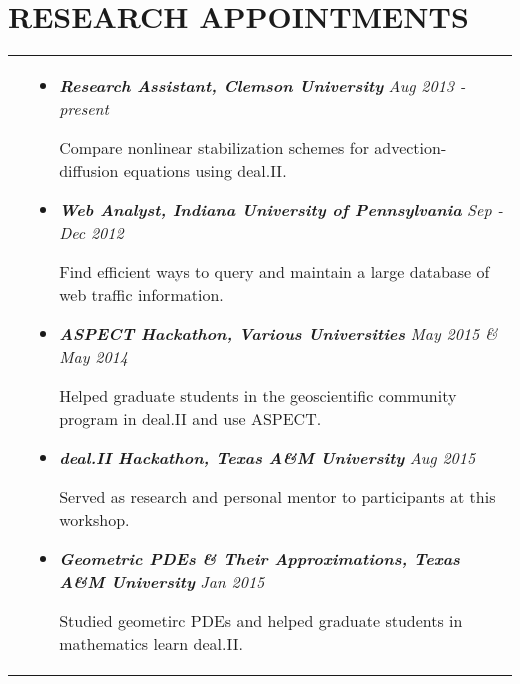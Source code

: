 \documentclass[10pt]{article}
\begin{document}
\section{\textbf{RESEARCH APPOINTMENTS}}
\vspace*{-\baselineskip}
\hskip-1.7in
\begin{tabularx}{1.5\linewidth}{>{\raggedleft\scshape}p{3cm}X}

  &\begin{itemize}
    \setlength\itemsep{.005em}
  \item \textbf{\textit{Research Assistant, Clemson University}}    \hspace{50 mm}\textit{Aug 2013 - present}

	Compare nonlinear stabilization schemes for advection-diffusion equations using deal.II.        
             
\item \textbf{\textit{Web Analyst, Indiana University of Pennsylvania}} \hspace{33 mm}\textit{Sep - Dec 2012}
  
        Find efficient ways to query and maintain a large database of web traffic information.
             
\item \textbf{\textit{ASPECT Hackathon, Various Universities}} \hspace{46 mm}\textit{May 2015 \& May 2014}
  
            
            Helped graduate students in the geoscientific community program in deal.II and use ASPECT.
             
\item \textbf{\textit{deal.II Hackathon, Texas A\&M University}} \hspace{46 mm}\textit{Aug 2015}
  
            Served as research and personal mentor to participants at this workshop.
            
            \item \textbf{\textit{Geometric PDEs \& Their Approximations, Texas A\&M University}} \hspace{3 mm}\textit{Jan 2015}
  
            Studied geometirc PDEs and helped graduate students in mathematics learn deal.II.
             
  \end{itemize} 

\end{tabularx}
 
\end{document}
